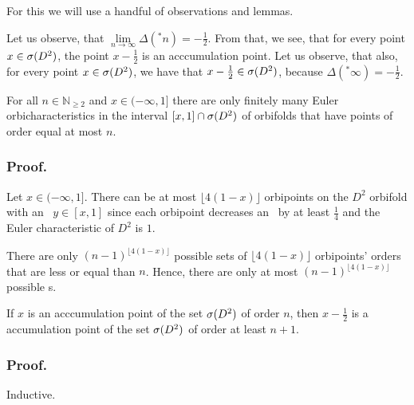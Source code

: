 For this we will use  
a handful of observations and lemmas. 
\begin{observation}\label{accumulation_points_are_in_the_spectrum}
Let us observe, that $\lim\limits_{n \to \infty} \Delta(^\ast n) = -\frac{1}{2}$. From that, 
we see, 
that for every point $x \in {{\sigma}(D^2)}$, the point $x - \frac{1}{2}$ is an acccumulation point. 
Let us observe, that also, for every point $x \in {{\sigma}(D^2)}$, we have that $x - \frac{1}{2} 
\in {{\sigma}(D^2)}$, 
because $\Delta(^\ast \infty) = -\frac{1}{2}$. 
\end{observation}

\begin{lemma}\label{finiteness_lemma}
For all $n \in \mathbb{N}_{\geq 2}$ and $x \in (-\infty, 1]$ there are only finitely 
many Euler orbicharacteristics
in the interval $[x,1] \cap {{\sigma}(D^2)}$ of orbifolds that have points of order equal 
at most $n$. 
\end{lemma}
\subsubsection{Proof.} 

Let $x \in (-\infty, 1]$. There can be at most $\lfloor 4(1-x) \rfloor$ orbipoints on the 
$D^2$ orbifold 
with an \Eoc\ $y \in [x,1]$ since each orbipoint decreases an \Eoc\ by at least $\frac{1}{4}$ 
and the Euler characteristic of $D^2$ is $1$. 

There are only $(n-1)^{\lfloor 4(1-x) \rfloor}$ possible sets of $\lfloor 4(1-x) \rfloor$ 
orbipoints' orders that are less or equal than $n$. Hence, there are only at most 
$(n-1)^{\lfloor 4(1-x) \rfloor}$ possible \Eoc s.


\begin{lemma}\label{first_order_lemma}
If $x$ is an acccumulation point of the set ${{\sigma}(D^2)}$ of order $n$, then $x-\frac{1}{2}$ is a
 accumulation point of the set ${{\sigma}(D^2)}$ of order at least $n+1$. 
\end{lemma}
\subsubsection{Proof.}
Inductive. 

